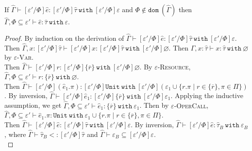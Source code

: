 \documentclass{llncs}
\newcommand{\keywadj}[1]{\mathtt{#1}}
\newcommand{\keyw}[1]{\keywadj{#1}~}
\newcommand{\kw}[1]{\keyw{ #1 }}
\newcommand{\kwa}[1]{\keywadj{ #1 }}
\newcommand{\Unit}[0]{ \kwa{Unit} }
\begin{document}
\hrulefill

\begin{lemma}
If $\hat \Gamma \vdash [\varepsilon'/\Phi]\hat e : [\varepsilon'/\Phi]\hat \tau~\kw{with} [\varepsilon'/\Phi]\varepsilon$ and $\Phi \notin \kw{dom}(\hat \Gamma)$ then $\hat \Gamma, \Phi \subseteq \varepsilon' \vdash \hat e: \hat \tau~\kw{with} \varepsilon$.
\end{lemma}

\begin{proof} By induction on the derivation of $\hat \Gamma \vdash [\varepsilon'/\Phi]\hat e: [\varepsilon'/\Phi]\hat \tau~\kw{with} [\varepsilon'/\Phi]\varepsilon$. \\

 Then $\hat \Gamma, x: [\varepsilon'/\Phi]\hat \tau \vdash [\varepsilon'/\Phi]x: [\varepsilon'/\Phi]\hat \tau~\kw{with} [\varepsilon'/\Phi]\varnothing$. Then $\hat \Gamma, x: \hat \tau \vdash x: \hat \tau~\kw{with} \varnothing$ by \textsc{$\varepsilon$-Var}.\\

 Then $\hat \Gamma \vdash [\varepsilon'/\Phi]r: [\varepsilon'/\Phi]\{ \overline{r} \}~\kw{with} [\varepsilon'/\Phi]\varnothing$. By \textsc{$\varepsilon$-Resource}, $\hat \Gamma, \Phi \subseteq \varepsilon' \vdash r: \{ \overline{r} \}~\kw{with} \varnothing$.\\

 Then $\hat \Gamma \vdash [\varepsilon'/\Phi](\hat e_1.\pi): [\varepsilon'/\Phi]\Unit~\kw{with} [\varepsilon'/\Phi](\varepsilon_1 \cup \{ r.\pi \mid r \in \{ \overline{r} \}, \pi \in \Pi \})$. By inversion, $\hat \Gamma \vdash [\varepsilon'/\Phi]\hat e_1: [\varepsilon'/\Phi]\{ \overline{r} \}~\kw{with} [\varepsilon'/\Phi]\varepsilon_1$. Applying the inductive assumption, we get $\hat \Gamma, \Phi \subseteq \varepsilon' \vdash \hat e_1: \{ \overline{r} \}~\kw{with} \varepsilon_1$. Then by \textsc{$\varepsilon$-OperCall}, $\hat \Gamma, \Phi \subseteq \varepsilon' \vdash \hat e_1.\pi: \Unit~\kw{with} \varepsilon_1 \cup \{ r.\pi \mid r \in \{ \overline{r} \}, \pi \in \Pi \}$.\\

 Then $\hat \Gamma \vdash [\varepsilon'/\Phi]\hat e: [\varepsilon'/\Phi]\hat \tau~\kw{with} [\varepsilon'/\Phi]\varepsilon$. By inversion, $\hat \Gamma \vdash [\varepsilon'/\Phi]\hat e: \hat \tau_B~\kw{with} \varepsilon_B$, where $\hat \Gamma \vdash \hat \tau_B <: [\varepsilon'/\Phi]\hat \tau$ and $\hat \Gamma \vdash \varepsilon_B \subseteq [\varepsilon'/\Phi]\varepsilon$.\\


\end{proof}
\end{document}
